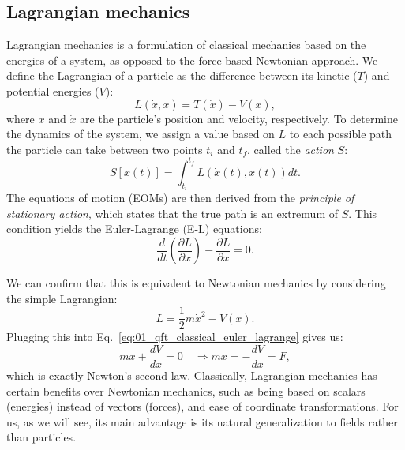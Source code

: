 \subsection{Lagrangian mechanics}
\label{sec:01_qft_classical_lagrangian}

Lagrangian mechanics is a formulation of classical mechanics based on the energies of a system, as opposed to the force-based Newtonian approach.
We define the Lagrangian of a particle as the difference between its kinetic ($T$) and potential energies ($V$):
\begin{equation}
	\label{eq:01_qft_classical_lagrangian}
	L(\dot x, x) = T(\dot x) - V(x),
\end{equation}
where $x$ and $\dot x$ are the particle's position and velocity, respectively.
To determine the dynamics of the system, we assign a value based on $L$ to each possible path the particle can take between two points $t_i$ and $t_f$, called the \textit{action} $S$:
\begin{equation}
	\label{eq:01_qft_classical_action}
	S[x(t)] = \int_{t_i}^{t_f} L(\dot x(t), x(t)) dt.
\end{equation}
The equations of motion (EOMs) are then derived from the \textit{principle of stationary action}, which states that the true path is an extremum of $S$.
This condition yields the Euler-Lagrange (E-L) equations:
\begin{equation}
	\label{eq:01_qft_classical_euler_lagrange}
	\frac{d}{dt}\left(\frac{\partial L}{\partial \dot x}\right) - \frac{\partial L}{\partial x} = 0.
\end{equation}

\begin{example}
\label{ex:01_qft_lagrangian_classical_newton}
We can confirm that this is equivalent to Newtonian mechanics by considering the simple Lagrangian:
\begin{equation}
\label{eq:01_qft_classical_lagrangian_newton}
L = \frac{1}{2}m\dot x^2 - V(x).
\end{equation}
Plugging this into Eq.~\ref{eq:01_qft_classical_euler_lagrange} gives us:
\begin{equation}
	\label{eq:01_qft_classical_euler_lagrange_newton}
	m\ddot x + \frac{d V}{d x} = 0 \quad\Rightarrow m\ddot x = -\frac{d V}{d x} = F,
\end{equation}
which is exactly Newton's second law.
Classically, Lagrangian mechanics has certain benefits over Newtonian mechanics, such as being based on scalars (energies) instead of vectors (forces), and ease of coordinate transformations.
For us, as we will see, its main advantage is its natural generalization to fields rather than particles.
\end{example}

